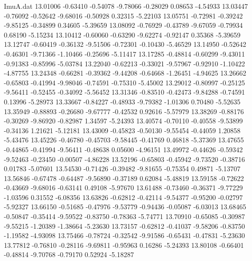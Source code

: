 \begin{filecontents}{ImuA.dat}
  13.01006   -0.63410   -0.54078   -9.78066   -0.28029    0.08653   -4.54933
  13.03447   -0.76092   -0.52642   -9.68016   -0.50928    0.32315   -5.22103
  13.05751   -0.72981   -0.39242   -9.85125   -0.34899    0.34605   -5.39659
  13.08092   -0.76929   -0.43789   -9.67059   -0.79934    0.68190   -5.15234
  13.10412   -0.60060   -0.63290   -9.62274   -0.92147    0.35368   -5.39659
  13.12747   -0.60419   -0.36132   -9.51506   -0.72301   -0.10430   -5.46529
  13.14950   -0.52642   -0.46301   -9.71366   -1.10466   -0.25696   -5.11417
  13.17285   -0.48814   -0.60299   -9.43011   -0.91383   -0.85996   -5.03784
  13.22040   -0.62213   -0.33021   -9.57967   -0.92910   -1.10422   -4.87755
  13.24348   -0.66281   -0.39362   -9.44208   -0.64668   -1.26451   -4.94625
  13.26662   -0.65803   -0.41994   -9.98046   -0.74591   -0.75310   -5.45002
  13.29012   -0.80997   -0.25125   -9.56411   -0.52455   -0.34092   -5.56452
  13.31346   -0.83510   -0.42473   -9.84288   -0.74591    0.13996   -5.28973
  13.33667   -0.84227   -0.48933   -9.79382   -1.01306    0.70480   -5.52635
  13.35949   -0.88893   -0.26680   -9.67777   -0.42532    0.92616   -5.57979
  13.38269   -0.88176   -0.30269   -9.86920   -0.82987    1.34597   -5.24393
  13.40574   -0.70110   -0.40558   -9.53899   -0.34136    1.21621   -5.12181
  13.43009   -0.45823   -0.50130   -9.55454   -0.44059    1.20858   -5.43476
  13.45226   -0.46780   -0.45703   -9.58445   -0.41769    0.46818   -5.37369
  13.47655   -0.44865   -0.41994   -9.56411   -0.48638    0.05600   -4.96151
  13.49972   -0.44626   -0.59342   -9.52463   -0.23450   -0.00507   -4.86228
  13.52196   -0.65803   -0.45942   -9.73520   -0.38716    0.01783   -5.07601
  13.54530   -0.71426   -0.39482   -9.81655   -0.75354    0.49871   -5.13707
  13.56846   -0.67478   -0.64487   -9.56890   -0.37189    0.62084   -5.48819
  13.59158   -0.72622   -0.43669   -9.68016   -0.63141    0.49108   -5.97670
  13.61488   -0.73460   -0.36371   -9.77229   -1.03596    0.31552   -6.08356
  13.63826   -0.62812   -0.42114   -9.54377   -0.95200   -0.02797   -5.92327
  13.66150   -0.51685   -0.47976   -9.53779   -0.94436   -0.05087   -6.03013
  13.68465   -0.50847   -0.35414   -9.59522   -0.83750   -0.78363   -5.74771
  13.70910   -0.65085   -0.30987   -9.55215   -1.20389   -1.38664   -5.23630
  13.73157   -0.62812   -0.41037   -9.58206   -0.83750   -1.19582   -4.93098
  13.75466   -0.78724   -0.32542   -9.91586   -0.65431   -0.47831   -5.23630
  13.77812   -0.76810   -0.28116   -9.69811   -0.95963    0.16286   -5.24393
  13.80108   -0.66401   -0.48814   -9.70768   -0.79170    0.52924   -5.18287

\end{filecontents}
